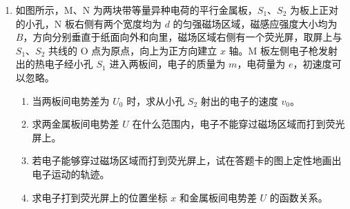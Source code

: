 \documentclass[\gkver]{gaokaozhenti}
\begin{document}
\begin{enumerate}


\item
如图所示，M、N 为两块带等量异种电荷的平行金属板，$S_{1}$、$S_{2}$ 为板上正对的小孔，N 板右侧有两个宽度均为 $d$ 的匀强磁场区域，磁感应强度大小均为 $B$，方向分别垂直于纸面向外和向里，磁场区域右侧有一个荧光屏，取屏上与 $S_{1}$、$S_{2}$ 共线的 O 点为原点，向上为正方向建立 $x$ 轴。M 板左侧电子枪发射出的热电子经小孔 $S_{1}$ 进入两板间，电子的质量为 $m$，电荷量为 $e$，初速度可以忽略。

\begin{enumerate}
	\item
	当两板间电势差为 $U_{0}$ 时，求从小孔 $S_{2}$ 射出的电子的速度 $v_{0}$。

	\item
	求两金属板间电势差 $U$ 在什么范围内，电子不能穿过磁场区域而打到荧光屏上。

	\item
	若电子能够穿过磁场区域而打到荧光屏上，试在答题卡的图上定性地画出电子运动的轨迹。

	\item
	求电子打到荧光屏上的位置坐标 $x$ 和金属板间电势差 $U$ 的函数关系。
\end{enumerate}


\end{enumerate}
\end{document}
